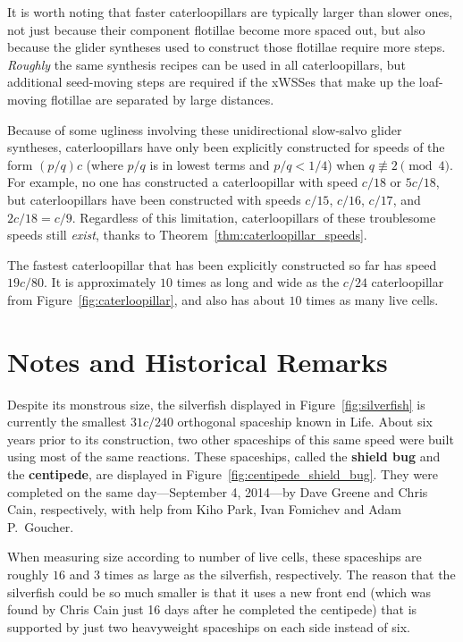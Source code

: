 It is worth noting that faster caterloopillars are typically larger than slower ones, not just because their component flotillae become more spaced out, but also because the glider syntheses used to construct those flotillae require more steps. \emph{Roughly} the same synthesis recipes can be used in all caterloopillars, but additional seed-moving steps are required if the xWSSes that make up the loaf-moving flotillae are separated by large distances.

Because of some ugliness involving these unidirectional slow-salvo glider syntheses, caterloopillars have only been explicitly constructed for speeds of the form $(p/q)c$ (where $p/q$ is in lowest terms and $p/q < 1/4$) when $q \not\equiv 2 \pmod{4}$. For example, no one has constructed a caterloopillar with speed $c/18$ or $5c/18$, but caterloopillars have been constructed with speeds $c/15$, $c/16$, $c/17$, and $2c/18 = c/9$. Regardless of this limitation, caterloopillars of these troublesome speeds still \emph{exist}, thanks to Theorem~\ref{thm:caterloopillar_speeds}.

The fastest caterloopillar that has been explicitly constructed so far has speed $19c/80$. It is approximately $10$ times as long and wide as the $c/24$ caterloopillar from Figure~\ref{fig:caterloopillar}, and also has about $10$ times as many live cells.


\section{Notes and Historical Remarks}\label{sec:self_support_history}

Despite its monstrous size, the silverfish displayed in Figure~\ref{fig:silverfish} is currently the smallest $31c/240$ orthogonal spaceship known in Life. About six years prior to its construction, two other spaceships of this same speed were built using most of the same reactions. These spaceships, called the \textbf{shield bug} and the \textbf{centipede}, are displayed in Figure~\ref{fig:centipede_shield_bug}. They were completed on the same day---September 4, 2014---by Dave Greene and Chris Cain, respectively, with help from Kiho Park, Ivan Fomichev and Adam P.~Goucher.

When measuring size according to number of live cells, these spaceships are roughly $16$ and $3$ times as large as the silverfish, respectively. The reason that the silverfish could be so much smaller is that it uses a new front end (which was found by Chris Cain just 16 days after he completed the centipede) that is supported by just two heavyweight spaceships on each side instead of six.

